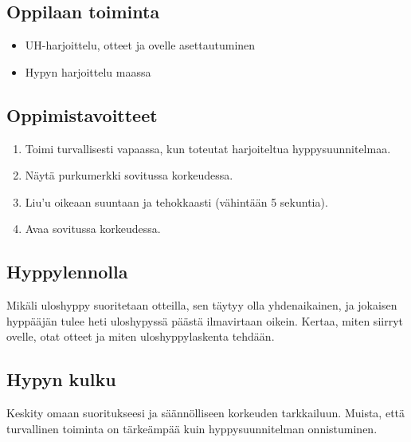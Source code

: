 \subsection{ Oppilaan toiminta }
\label{jatkokoulutuksen-suoritukset-oppilaan-toiminta}

\begin{itemize}
\item  UH-harjoittelu, otteet ja ovelle asettautuminen 
\item  Hypyn harjoittelu maassa 
\end{itemize}
\subsection{ Oppimistavoitteet }
\label{jatkokoulutuksen-suoritukset-oppimistavoitteet}

\begin{enumerate}[label=\bfseries \arabic*)]
\item  Toimi turvallisesti vapaassa, kun toteutat harjoiteltua hyppysuunnitelmaa. 
\item  Näytä purkumerkki sovitussa korkeudessa. 
\item  Liu'u oikeaan suuntaan ja tehokkaasti (vähintään 5 sekuntia). 
\item  Avaa sovitussa korkeudessa. 
\end{enumerate}
\subsection{ Hyppylennolla }
\label{jatkokoulutuksen-suoritukset-hyppylennolla}


Mikäli uloshyppy suoritetaan otteilla, sen täytyy olla yhdenaikainen, ja jokaisen hyppääjän tulee heti uloshypyssä päästä ilmavirtaan oikein. Kertaa, miten siirryt ovelle, otat otteet ja miten uloshyppylaskenta tehdään.  

\subsection{ Hypyn kulku }
\label{jatkokoulutuksen-suoritukset-hypyn-kulku}


Keskity omaan suoritukseesi ja säännölliseen korkeuden tarkkailuun. Muista, että turvallinen toiminta on tärkeämpää kuin hyppysuunnitelman onnistuminen. 


